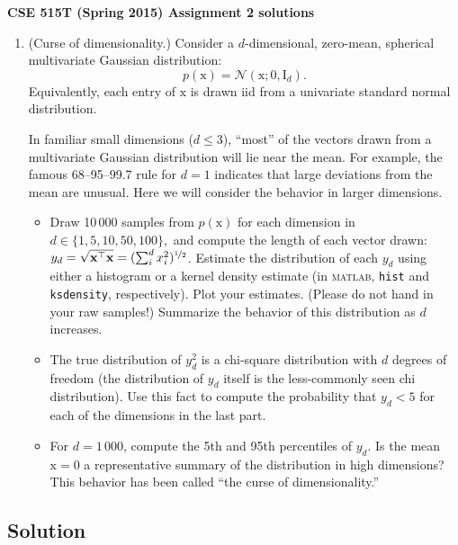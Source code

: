 \documentclass{article}
\newcommand{\acro}[1]{\textsc{\MakeLowercase{#1}}}
\newcommand{\mc}[1]{\mathcal{#1}}
\newcommand{\mat}[1]{\bm{\mathrm{#1}}}
\renewcommand{\vec}[1]{\bm{\mathrm{#1}}}
\newcommand{\trans}{^\top}
\begin{document}
{\large \textbf{CSE 515T (Spring 2015) Assignment 2 solutions}} \\

\begin{enumerate}

\item
  (Curse of dimensionality.)
  Consider a $d$-dimensional, zero-mean, spherical multivariate
  Gaussian distribution:
  \begin{equation*}
    p(\vec{x}) = \mc{N}(\vec{x}; \vec{0}, \mat{I}_d).
  \end{equation*}
  Equivalently, each entry of $\vec{x}$ is drawn iid from a univariate
  standard normal distribution.

  In familiar small dimensions ($d \leq 3$), ``most'' of the vectors
  drawn from a multivariate Gaussian distribution will lie near the
  mean.  For example, the famous 68--95--99.7 rule for $d = 1$
  indicates that large deviations from the mean are unusual.  Here we
  will consider the behavior in larger dimensions.
  \begin{itemize}
  \item Draw 10\,000 samples from $p(\vec{x})$ for each dimension in
    $d \in \{1, 5, 10, 50, 100\},$ and compute the length of each
    vector drawn: $y_d = \sqrt{\vec{x}\trans \vec{x}} = (\sum_i^d
    x_i^2)^{\nicefrac{1}{2}}$.  Estimate the distribution of each
    $y_d$ using either a histogram or a kernel density estimate (in
    \acro{MATLAB}, \texttt{hist} and \texttt{ksdensity},
    respectively).  Plot your estimates.  (Please do not hand in your
    raw samples!)  Summarize the behavior of this distribution as $d$
    increases.
  \item
    The true distribution of $y_d^2$ is a chi-square distribution with
    $d$ degrees of freedom (the distribution of $y_d$ itself is the
    less-commonly seen chi distribution).  Use this fact to compute
    the probability that $y_d < 5$ for each of the dimensions in the
    last part.
  \item
    For $d = 1\,000$, compute the 5th and 95th percentiles of $y_d$.
    Is the mean $\vec{x} = \vec{0}$ a representative summary of the
    distribution in high dimensions?  This behavior has been called
    ``the curse of dimensionality.''
  \end{itemize}

\end{enumerate}

\subsection*{Solution}
\end{document}
